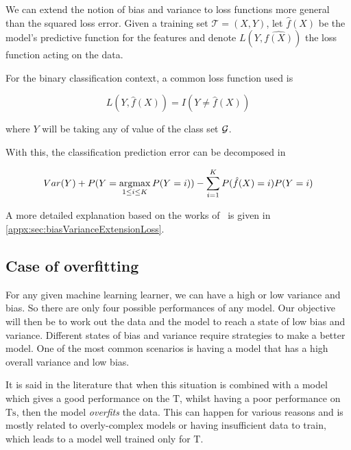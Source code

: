 We can extend the notion of bias and variance to loss functions more general than the squared loss error. 
Given a training set $\mathcal{T} = (X,Y)$, let $\hat{f}(X)$ be the model's predictive function for the features and denote $L( Y,\hat{f(X)} )$ the loss function acting on the data.


For the binary classification context, a common loss function used is

\begin{equation}
L(Y, \hat{f}(X)) = I(Y \neq \hat{f}(X))
\end{equation}\label{eq:classificationLossFunction}

where $Y$ will be taking any of value of the class set $\operatorname{\mathcal{G}}$.

With this, the classification prediction error can be decomposed in

\begin{equation}
Var(Y) + P(Y=\operatorname*{argmax}_{1\leq i \leq K} P(Y=i)) - \sum_{i=1}^K P(\hat{f}(X) =i)P(Y=i)
\end{equation}

A more detailed explanation based on the works of~\cite{james-biasVarianceGeneral} is given in \cref{appx:sec:biasVarianceExtensionLoss}.

\subsection{Case of overfitting}\label{subsection-overfitting}

For any given machine learning learner, we can have a high or low variance and bias.
So there are only four possible performances of any model.
Our objective will then be to work out the data and the model to reach a state of low bias and variance.
Different states of bias and variance require strategies to make a better model.
One of the most common scenarios is having a model that has a high overall variance and low bias.

It is said in the literature that when this situation is combined with a model which gives a good performance on the $\mathrm{T}$, whilst having a poor performance on $\mathrm{Ts}$, then the model \textit{overfits} the data.
This can happen for various reasons and is mostly related to overly-complex models or having insufficient data to train, which leads to a model well trained only for $\mathrm{T}$.

